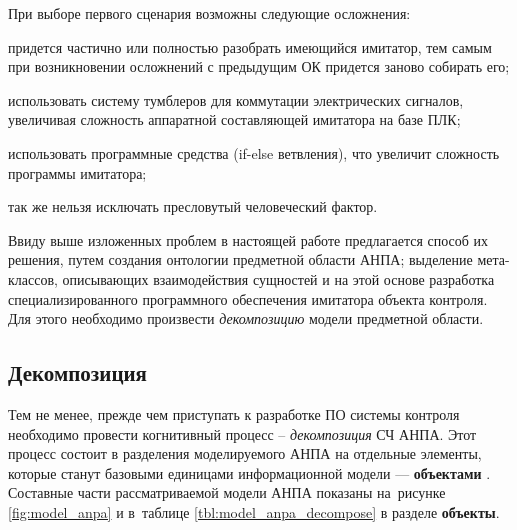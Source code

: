 При выборе первого сценария возможны следующие осложнения:
\begin{enumerate*}[label=\arabic*\upshape)]
    \item придется частично или полностью разобрать имеющийся имитатор, тем самым при возникновении 
        осложнений с предыдущим ОК придется заново собирать его;
    \item использовать систему тумблеров для коммутации электрических сигналов,
        увеличивая сложность аппаратной составляющей имитатора на базе ПЛК;
    \item использовать программные средства (if-else ветвления), что увеличит сложность программы имитатора;
    \item так же нельзя исключать пресловутый человеческий фактор.
\end{enumerate*}

Ввиду выше изложенных проблем в настоящей работе предлагается способ их решения,
путем создания онтологии предметной области АНПА;
выделение мета-классов, описывающих взаимодействия сущностей
и на этой основе разработка специализированного программного обеспечения
имитатора объекта контроля. Для этого необходимо произвести \textit{декомпозицию} модели предметной области.

\subsection{Декомпозиция} \label{sec:anpa_decompose}

Тем не менее, прежде чем приступать к разработке ПО системы контроля необходимо провести когнитивный процесс -- \textit{декомпозиция} СЧ АНПА.
Этот процесс состоит в разделения моделируемого АНПА на отдельные элементы, которые станут базовыми единицами информационной модели --- \textbf{объектами} \cite{journal:vestnik_igeu:elizarova}.
Составные части рассматриваемой модели АНПА показаны на~рисунке \ref{fig:model_anpa} и в~таблице \ref{tbl:model_anpa_decompose} в разделе \textbf{объекты}.

